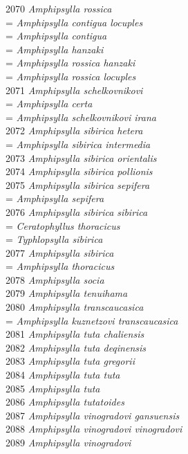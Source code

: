 \documentclass[
]{article}
\begin{document}
2070 \emph{Amphipsylla rossica}\\
= \emph{Amphipsylla contigua locuples}\\
= \emph{Amphipsylla contigua}\\
= \emph{Amphipsylla hanzaki}\\
= \emph{Amphipsylla rossica hanzaki}\\
= \emph{Amphipsylla rossica locuples}\\
2071 \emph{Amphipsylla schelkovnikovi}\\
= \emph{Amphipsylla certa}\\
= \emph{Amphipsylla schelkovnikovi irana}\\
2072 \emph{Amphipsylla sibirica hetera}\\
= \emph{Amphipsylla sibirica intermedia}\\
2073 \emph{Amphipsylla sibirica orientalis}\\
2074 \emph{Amphipsylla sibirica pollionis}\\
2075 \emph{Amphipsylla sibirica sepifera}\\
= \emph{Amphipsylla sepifera}\\
2076 \emph{Amphipsylla sibirica sibirica}\\
= \emph{Ceratophyllus thoracicus}\\
= \emph{Typhlopsylla sibirica}\\
2077 \emph{Amphipsylla sibirica}\\
= \emph{Amphipsylla thoracicus}\\
2078 \emph{Amphipsylla socia}\\
2079 \emph{Amphipsylla tenuihama}\\
2080 \emph{Amphipsylla transcaucasica}\\
= \emph{Amphipsylla kuznetzovi transcaucasica}\\
2081 \emph{Amphipsylla tuta chaliensis}\\
2082 \emph{Amphipsylla tuta deqinensis}\\
2083 \emph{Amphipsylla tuta gregorii}\\
2084 \emph{Amphipsylla tuta tuta}\\
2085 \emph{Amphipsylla tuta}\\
2086 \emph{Amphipsylla tutatoides}\\
2087 \emph{Amphipsylla vinogradovi gansuensis}\\
2088 \emph{Amphipsylla vinogradovi vinogradovi}\\
2089 \emph{Amphipsylla vinogradovi}\\
\end{document}
